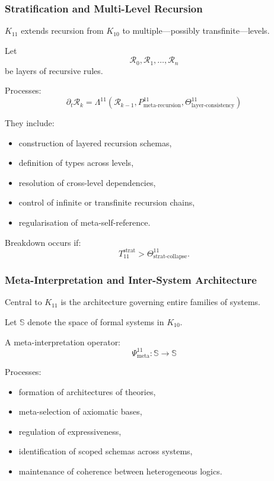 \subsubsection{Stratification and Multi-Level Recursion}

$K_{11}$ extends recursion from $K_{10}$ to multiple—possibly transfinite—levels.

Let 
\[
\mathcal{R}_0, \mathcal{R}_1, \ldots, \mathcal{R}_n
\]
be layers of recursive rules.

Processes:
\[
\partial_t \mathcal{R}_k 
= \Lambda^{11}(\mathcal{R}_{k-1}, 
               P^{11}_{\text{meta-recursion}}, 
               \Theta^{11}_{\text{layer-consistency}})
\]

They include:
\begin{itemize}
    \item construction of layered recursion schemas,
    \item definition of types across levels,
    \item resolution of cross-level dependencies,
    \item control of infinite or transfinite recursion chains,
    \item regularisation of meta-self-reference.
\end{itemize}

Breakdown occurs if:
\[
T_{11}^{\text{strat}} > \Theta^{11}_{\text{strat-collapse}}.
\]

\subsubsection{Meta-Interpretation and Inter-System Architecture}

Central to $K_{11}$ is the architecture governing entire families of systems.

Let $\mathbb{S}$ denote the space of formal systems in $K_{10}$.

A meta-interpretation operator:
\[
\Psi^{11}_{\text{meta}} : \mathbb{S} \to \mathbb{S}
\]

Processes:
\begin{itemize}
    \item formation of architectures of theories,
    \item meta-selection of axiomatic bases,
    \item regulation of expressiveness,
    \item identification of scoped schemas across systems,
    \item maintenance of coherence between heterogeneous logics.
\end{itemize}

